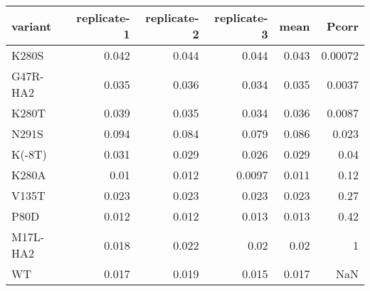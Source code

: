 \begin{tabular}{lrrrrr}
\toprule
  variant &  replicate-1 &  replicate-2 &  replicate-3 &  mean &   Pcorr \\
\midrule
    K280S &        0.042 &        0.044 &        0.044 & 0.043 & 0.00072 \\
 G47R-HA2 &        0.035 &        0.036 &        0.034 & 0.035 &  0.0037 \\
    K280T &        0.039 &        0.035 &        0.034 & 0.036 &  0.0087 \\
    N291S &        0.094 &        0.084 &        0.079 & 0.086 &   0.023 \\
   K(-8T) &        0.031 &        0.029 &        0.026 & 0.029 &    0.04 \\
    K280A &         0.01 &        0.012 &       0.0097 & 0.011 &    0.12 \\
    V135T &        0.023 &        0.023 &        0.023 & 0.023 &    0.27 \\
     P80D &        0.012 &        0.012 &        0.013 & 0.013 &    0.42 \\
 M17L-HA2 &        0.018 &        0.022 &         0.02 &  0.02 &       1 \\
       WT &        0.017 &        0.019 &        0.015 & 0.017 &     NaN \\
\bottomrule
\end{tabular}
